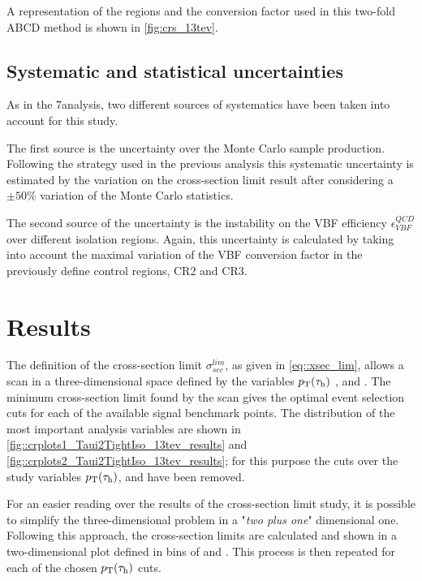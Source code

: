 A representation of the regions and the conversion factor used in this two-fold ABCD method is shown in \autoref{fig:crs_13tev}.

\subsection{Systematic and statistical uncertainties}

As in the 7\tev analysis, two different sources of systematics have been taken into account for this study. 

The first source is the uncertainty over the Monte Carlo sample production. Following the strategy used in the previous analysis this systematic uncertainty is estimated by the variation on the cross-section limit result after considering a $\pm 50\%$ variation of the Monte Carlo statistics.

The second source of the uncertainty is the instability on the VBF efficiency $\epsilon^{QCD}_{VBF}$ over different \hadtau isolation regions. Again, this uncertainty is calculated by taking into account the maximal variation of the VBF conversion factor in the previously define control regions, CR2 and CR3.

\section{Results}

The definition of the cross-section limit $\sigma^{lim}_{sec}$, as given in \autoref{eq::xsec_lim}, allows a scan in a three-dimensional space defined by the variables $p_{\text{T}}(\tau_{\text{h}})$ , \mjj and \met. The minimum cross-section limit found by the scan gives the optimal event selection cuts for each of the available signal benchmark points. The distribution of the most important analysis variables are shown in \autoref{fig::crplots1_Taui2TightIso_13tev_results} and \autoref{fig::crplots2_Taui2TightIso_13tev_results}; for this purpose the cuts over the study variables $p_{\text{T}}(\tau_{\text{h}})$, \mjj and \met have been removed. 

For an easier reading over the results of the cross-section limit study, it is possible to simplify the three-dimensional problem in a "\textit{two plus one}" dimensional one. Following this approach, the cross-section limits are calculated and shown in a two-dimensional plot defined in bins of \mjj and \met. This process is then repeated for each of the chosen $p_{\text{T}}(\tau_{\text{h}})$ cuts.

